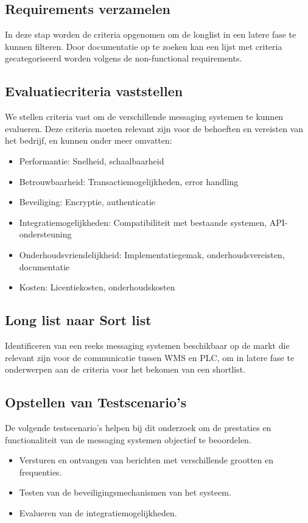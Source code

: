  
\subsection{Requirements verzamelen}
In deze stap worden de criteria opgenomen om de longlist in een latere fase te kunnen filteren.
Door documentatie op te zoeken kan een lijst met criteria gecategoriseerd worden volgens de non-functional requirements.

\subsection{Evaluatiecriteria vaststellen}
We stellen criteria vast om de verschillende messaging systemen te kunnen evalueren. 
Deze criteria moeten relevant zijn voor de behoeften en vereisten van het bedrijf, en kunnen onder meer omvatten:
\begin{itemize}
  \item Performantie: Snelheid, schaalbaarheid
  \item Betrouwbaarheid: Transactiemogelijkheden, error handling
  \item Beveiliging: Encryptie, authenticatie
  \item Integratiemogelijkheden: Compatibiliteit \newline met bestaande systemen, API-ondersteuning
  \item Onderhoudsvriendelijkheid: Implementatiegemak, onderhoudsvereisten, documentatie
  \item Kosten: Licentiekosten, onderhoudskosten
\end{itemize}

\subsection{Long list naar Sort list}
Identificeren van een reeks messaging systemen beschikbaar op de markt die relevant zijn voor de communicatie tussen WMS en PLC, 
om in latere fase te onderwerpen aan de criteria voor het bekomen van een shortlist.

\subsection{Opstellen van Testscenario's}
De volgende testscenario's helpen bij dit onderzoek om de prestaties en functionaliteit van de messaging systemen 
objectief te beoordelen.

\begin{itemize}
  \item Versturen en ontvangen van berichten met verschillende grootten en frequenties.
  \item Testen van de beveiligingsmechanismen van het systeem.
  \item Evalueren van de integratiemogelijkheden.
 \end{itemize}

